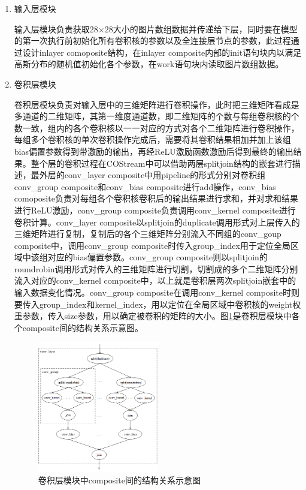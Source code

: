 \begin{enumerate}
\item 输入层模块

输入层模块负责获取28×28大小的图片数组数据并传递给下层，同时要在模型
的第一次执行前初始化所有卷积核的参数以及全连接层节点的参数，此过程通过设计inlayer comoposite结构，在inlayer composite内部的init语句块内以满足高斯分布的随机值初始化各个参数，在work语句块内读取图片数组数据。

\item 卷积层模块

卷积层模块负责对输入层中的三维矩阵进行卷积操作，此时把三维矩阵看成是多通道的二维矩阵，其第一维度通道数，即二维矩阵的个数与每组卷积核的个数一致，组内的各个卷积核以一一对应的方式对各个二维矩阵进行卷积操作，每组多个卷积核的单次卷积操作完成后，需要将其卷积结果相加并加上该组bias偏置参数得到带激励的输出，再经ReLU激励函数激励后得到最终的输出结果。整个层的卷积过程在COStream中可以借助两层splitjoin结构的嵌套进行描述，最外层的conv\_layer composite中用pipeline的形式分别对卷积组conv\_group composite和conv\_bias composite进行add操作，conv\_bias comoposite负责对每组各个卷积核卷积后的输出结果进行求和，并对求和结果进行ReLU激励，conv\_group composite负责调用conv\_kernel composite进行卷积计算。conv\_layer composite以splitjoin的duplicate调用形式对上层传入的三维矩阵进行复制，复制后的各个三维矩阵分别流入不同组的conv\_goup composite中，调用conv\_group composite时传入group\_index用于定位全局区域中该组对应的bias偏置参数。conv\_group composite则以splitjoin的roundrobin调用形式对传入的三维矩阵进行切割，切割成的多个二维矩阵分别流入对应的conv\_kernel composite中，以上就是卷积层两次splitjoin嵌套中的输入数据变化情况。conv\_group composite在调用conv\_kernel composite时则要传入group\_index和kernel\_index，用以定位在全局区域中卷积核的weight权重参数，传入size参数，用以确定被卷积的矩阵的大小。图\ref{fig:cnn_conv_layer}是卷积层模块中各个composite间的结构关系示意图。

\begin{figure}[!t]
\centering
\includegraphics[width=0.5\textwidth]{../img/Chap_Application/Yu/cnn_conv_layer.png}
\caption{卷积层模块中composite间的结构关系示意图}
\label{fig:cnn_conv_layer}
\end{figure}


\end{enumerate}
